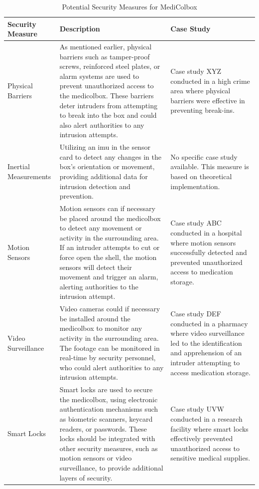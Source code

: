 \documentclass[../main.tex]{subfiles}
\begin{document}
\begin{table}[htbp]
    \centering
    \caption{Potential Security Measures for MediColbox}
    \label{tab:PotentialSecurityMeasuresForMediColbox}
    \begin{tabular}{|l|p{8.5cm}|p{5.5cm}|} \hline
        \textbf{Security Measure} & \textbf{Description} & \textbf{Case Study} \\ \hline
        
        Physical Barriers &
        As mentioned earlier,
        physical barriers such as tamper-proof screws,
        reinforced steel plates,
        or alarm systems are used to prevent unauthorized access to
        the \gls{medicolbox}.
        These barriers deter intruders from attempting to break into the box and could also alert authorities to any intrusion attempts. & Case study XYZ conducted in a high crime area where physical barriers were effective in preventing break-ins. \\ \hline
        
        Inertial Measurements &
        Utilizing an \gls{imu} in the sensor card to detect any changes in the box's orientation or movement, providing additional data for intrusion detection and prevention. & No specific case study available. This measure is based on theoretical implementation. \\ \hline
        
        Motion Sensors &
        Motion sensors can if necessary be placed around the \gls{medicolbox} to detect any movement or activity in the surrounding area. If an intruder attempts to cut or force open the shell, the motion sensors will detect their movement and trigger an alarm, alerting authorities to the intrusion attempt. & Case study ABC conducted in a hospital where motion sensors successfully detected and prevented unauthorized access to medication storage. \\ \hline
        
        Video Surveillance &
        Video cameras could if necessary be installed around the \gls{medicolbox} to monitor any activity in the surrounding area. The footage can be monitored in real-time by security personnel, who could alert authorities to any intrusion attempts. & Case study DEF conducted in a pharmacy where video surveillance led to the identification and apprehension of an intruder attempting to access medication storage. \\ \hline

        Smart Locks &
        Smart locks are used to secure the \gls{medicolbox}, using electronic authentication mechanisms such as biometric scanners, keycard readers, or passwords. These locks should be integrated with other security measures, such as motion sensors or video surveillance, to provide additional layers of security. & Case study UVW conducted in a research facility where smart locks effectively prevented unauthorized access to sensitive medical supplies. \\ \hline
        

\end{tabular}
\end{table}
\end{document}
